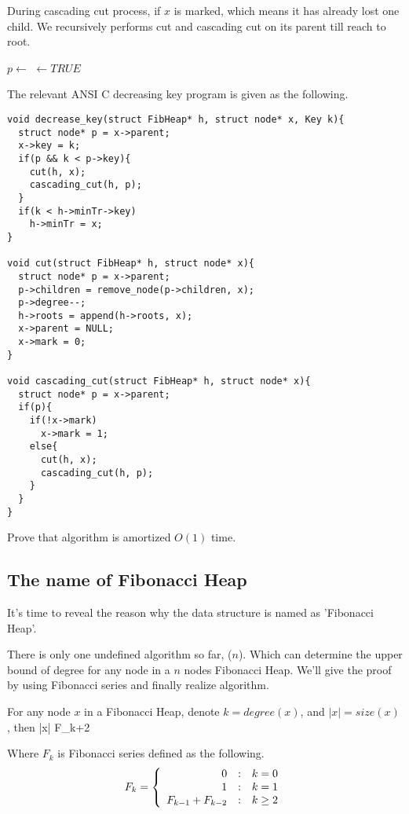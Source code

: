 \documentclass{article}
\begin{document}
During cascading cut process, if $x$ is marked, which means it has
already lost one child. We recursively performs cut and cascading cut
on its parent till reach to root.

\begin{algorithmic}[1]
  \State $p \gets $ 
      \State {} $\gets TRUE$
    \Else
      \State {}
      \State {}
    \EndIf
  \EndIf
\EndFunction
\end{algorithmic}

The relevant ANSI C decreasing key program is given as the following.

\lstset{language=C}
\begin{lstlisting}
void decrease_key(struct FibHeap* h, struct node* x, Key k){
  struct node* p = x->parent;
  x->key = k;
  if(p && k < p->key){
    cut(h, x);
    cascading_cut(h, p);
  }
  if(k < h->minTr->key)
    h->minTr = x;
}

void cut(struct FibHeap* h, struct node* x){
  struct node* p = x->parent;
  p->children = remove_node(p->children, x);
  p->degree--;
  h->roots = append(h->roots, x);
  x->parent = NULL;
  x->mark = 0;
}

void cascading_cut(struct FibHeap* h, struct node* x){
  struct node* p = x->parent;
  if(p){
    if(!x->mark)
      x->mark = 1;
    else{
      cut(h, x);
      cascading_cut(h, p);
    }
  }
}
\end{lstlisting}

\begin{Exercise}
Prove that  algorithm is amortized $O(1)$ time.
\end{Exercise}

\subsection{The name of Fibonacci Heap}
It's time to reveal the reason why the data structure is named
as 'Fibonacci Heap'.

There is only one undefined algorithm so far, ($n$).
Which can determine the upper bound of degree for any node in a $n$ nodes
Fibonacci Heap. We'll give the proof by using Fibonacci series and
finally realize  algorithm.

\begin{lemma}
\label{lemma:Fib-degree}
For any node $x$ in a Fibonacci Heap, denote $k = degree(x)$, and
$|x| = size(x)$, then
\be
  |x| \geq F_{k+2}
\ee

Where $F_k$ is Fibonacci series defined as the following.
\[
F_k = \left \{
  \begin{array}
  {r@{\quad:\quad}l}
  0 & k = 0 \\
  1 & k = 1 \\
  F_{k-1} + F_{k-2} & k \geq 2
  \end{array}
\right.
\]
\end{lemma}
\end{document}
